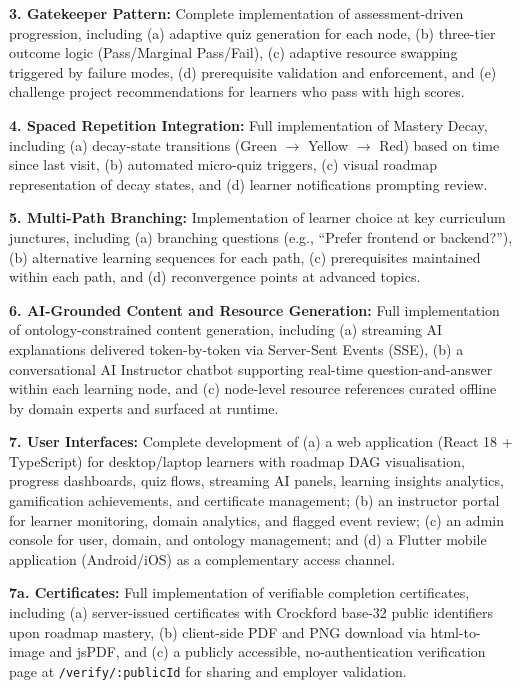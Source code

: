 \textbf{3. Gatekeeper Pattern:} Complete implementation of assessment-driven progression, including (a) adaptive quiz generation for each node, (b) three-tier outcome logic (Pass/Marginal Pass/Fail), (c) adaptive resource swapping triggered by failure modes, (d) prerequisite validation and enforcement, and (e) challenge project recommendations for learners who pass with high scores.

\textbf{4. Spaced Repetition Integration:} Full implementation of Mastery Decay, including (a) decay-state transitions (Green $\rightarrow$ Yellow $\rightarrow$ Red) based on time since last visit, (b) automated micro-quiz triggers, (c) visual roadmap representation of decay states, and (d) learner notifications prompting review.

\textbf{5. Multi-Path Branching:} Implementation of learner choice at key curriculum junctures, including (a) branching questions (e.g., \enquote{Prefer frontend or backend?}), (b) alternative learning sequences for each path, (c) prerequisites maintained within each path, and (d) reconvergence points at advanced topics.

\textbf{6. AI-Grounded Content and Resource Generation:} Full implementation of ontology-constrained content generation, including (a) streaming AI explanations delivered token-by-token via Server-Sent Events (SSE), (b) a conversational AI Instructor chatbot supporting real-time question-and-answer within each learning node, and (c) node-level resource references curated offline by domain experts and surfaced at runtime.

\textbf{7. User Interfaces:} Complete development of (a) a web application (React 18 + TypeScript) for desktop/laptop learners with roadmap DAG visualisation, progress dashboards, quiz flows, streaming AI panels, learning insights analytics, gamification achievements, and certificate management; (b) an instructor portal for learner monitoring, domain analytics, and flagged event review; (c) an admin console for user, domain, and ontology management; and (d) a Flutter mobile application (Android/iOS) as a complementary access channel.

\textbf{7a. Certificates:} Full implementation of verifiable completion certificates, including (a) server-issued certificates with Crockford base-32 public identifiers upon roadmap mastery, (b) client-side PDF and PNG download via html-to-image and jsPDF, and (c) a publicly accessible, no-authentication verification page at \texttt{/verify/:publicId} for sharing and employer validation.


